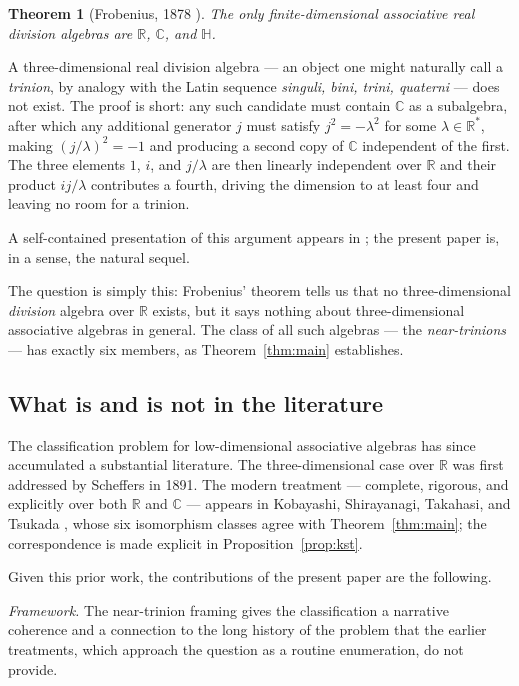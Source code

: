 \documentclass{amsart}
\theoremstyle{plain}
\newtheorem{theorem}{Theorem}[section]
\theoremstyle{definition}
\theoremstyle{remark}
\newcommand{\RR}{\mathbb{R}}
\newcommand{\CC}{\mathbb{C}}
\newcommand{\HH}{\mathbb{H}}
\begin{document}
\begin{theorem}[Frobenius, 1878 {\cite{Frobenius1878}}]\label{thm:frobenius}
  The only finite-dimensional associative real division algebras are
  $\RR$, $\CC$, and $\HH$.
\end{theorem}

A three-dimensional real division algebra --- an object one might
naturally call a \emph{trinion}, by analogy with the Latin sequence
\emph{singuli, bini, trini, quaterni} --- does not exist.
The proof is short: any such candidate must contain $\CC$ as a
subalgebra, after which any additional generator $j$ must satisfy
$j^2 = -\lambda^2$ for some $\lambda \in \RR^*$, making
$(j/\lambda)^2 = -1$ and producing a second copy of $\CC$ independent
of the first.
The three elements $1$, $i$, and $j/\lambda$ are then linearly
independent over $\RR$ and their product $ij/\lambda$ contributes a
fourth, driving the dimension to at least four and leaving no room for
a trinion.

A self-contained presentation of this argument appears in \cite{Shelton2024};
the present paper is, in a sense, the natural sequel.

The question is simply this: Frobenius' theorem tells us that no
three-dimensional \emph{division} algebra over $\RR$ exists, but it says
nothing about three-dimensional associative algebras in general.
The class of all such algebras --- the \emph{near-trinions} --- has exactly
six members, as Theorem~\ref{thm:main} establishes.

\subsection{What is and is not in the literature}

The classification problem for low-dimensional associative algebras has
since accumulated a substantial literature.
The three-dimensional case over $\RR$ was first addressed by Scheffers
\cite{Scheffers1891} in 1891.
The modern treatment --- complete, rigorous, and explicitly over both $\RR$
and $\CC$ --- appears in Kobayashi, Shirayanagi, Takahasi, and Tsukada
\cite{Kobayashi2021}, whose six isomorphism classes agree with
Theorem~\ref{thm:main}; the correspondence is made explicit in
Proposition~\ref{prop:kst}.

Given this prior work, the contributions of the present paper are
the following.

\emph{Framework.}
The near-trinion framing gives the classification a narrative coherence
and a connection to the long history of the problem that the earlier
treatments, which approach the question as a routine enumeration, do not provide.
\end{document}
